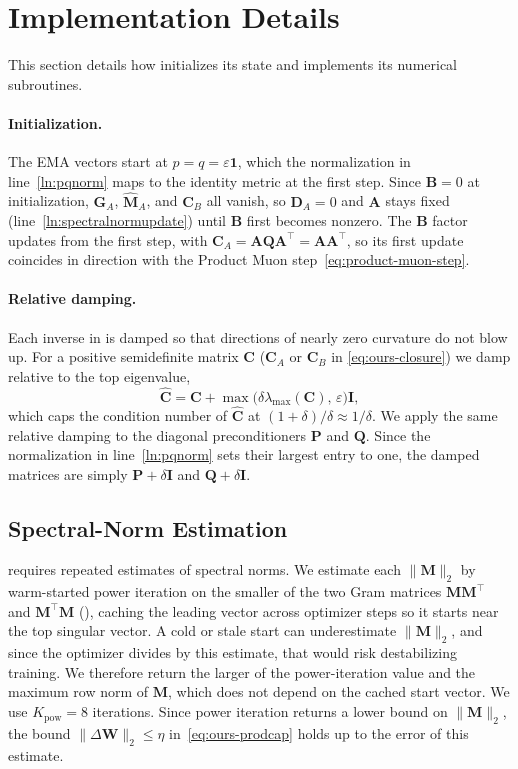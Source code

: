 \documentclass{article}
\newcommand{\mat}[1]{\bm{#1}}
\newcommand{\norm}[1]{\| #1\|}
\begin{document}
\clearpage
\section{Implementation Details}
\label{app:primitives}
This section details how  initializes its state and implements
its numerical subroutines.

\paragraph{Initialization.}\label{app:init}
The EMA vectors start at $p = q = \varepsilon\mathbf{1}$, which the
normalization in line~\ref{ln:pqnorm} maps to the identity metric at the first
step. Since $\mat{B}=0$ at initialization, $\mat{G}_A$, $\widehat{\mat{M}}_A$, and $\mat{C}_B$ all
vanish, so $\mat{D}_A=0$ and $\mat{A}$ stays fixed (line~\ref{ln:spectralnormupdate}) until
$\mat{B}$ first becomes nonzero. The $\mat{B}$ factor updates from the first step, with
$\mat{C}_A = \mat{A}\mat{Q}\mat{A}^\top = \mat{A}\mat{A}^\top$, so its first update coincides in direction with the
Product Muon step~\eqref{eq:product-muon-step}.

\paragraph{Relative damping.}\label{app:damping}
Each inverse in  is damped so that directions of
nearly zero curvature do not blow up. For a positive
semidefinite matrix $\mat{C}$ ($\mat{C}_A$ or $\mat{C}_B$ in \eqref{eq:ours-closure}) we damp relative to the top eigenvalue,
\[
    \widehat{\mat{C}} = \mat{C} + \max\bigl(\delta\lambda_{\max}(\mat{C}),\, \varepsilon\bigr) \mat{I},
\]
which caps the condition number of $\widehat{\mat{C}}$ at $(1+\delta)/\delta \approx 1/\delta$.
We apply the same relative damping to the diagonal preconditioners $\mat{P}$ and $\mat{Q}$.
Since the normalization in line~\ref{ln:pqnorm} sets their largest entry to
one, the damped matrices are simply $\mat{P}+\delta \mat{I}$ and $\mat{Q}+\delta \mat{I}$.

\subsection{Spectral-Norm Estimation}
\label{app:smax}
 requires repeated estimates of spectral norms.  
We estimate each $\norm{\mat{M}}_2$ by warm-started power iteration on the smaller of the two Gram matrices $\mat{M}\mat{M}^\top$ and $\mat{M}^\top \mat{M}$ (), caching the leading vector across optimizer steps so it starts near the top singular vector. A cold or stale start
can underestimate $\norm{\mat{M}}_2$, and since the optimizer divides by this estimate, that would risk destabilizing training.  We therefore return the larger of the power-iteration value and the maximum row norm of $\mat{M}$, which does not depend on the cached start vector. We use $K_{\mathrm{pow}} = 8$ iterations. Since power iteration returns a lower bound on $\norm{\mat{M}}_2$, the bound $\norm{\Delta\mat{W}}_2\le\eta$ in~\eqref{eq:ours-prodcap} holds up to the error of this estimate.
\end{document}
